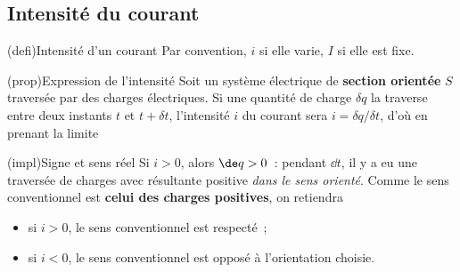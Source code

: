 \documentclass[../../main/main.tex]{subfiles}
\begin{document}
\subsection{Intensité du courant}

\begin{tcb}[label=def:intensité, sidebyside](defi){Intensité
			d'un courant}
	\tcblower
	Par convention, $i$ si elle varie, $I$ si elle est fixe.
\end{tcb}
\begin{tcb}[label=prop:intensité](prop){Expression de l'intensité}
	Soit un système électrique de \textbf{section orientée} $S$ traversée par
	des charges électriques. Si une quantité de charge $\delta q$ la traverse
	entre deux instants $t$ et $t + \delta t$, l'intensité $i$ du courant sera
	$i = \delta q/\delta t$, d'où en prenant la limite
	\psw{
		\[
			\boxed{
				i(t) =
				\lim_{\delta t \ra 0} \frac{\delta q}{\delta t} =
				\dv{q}{t}
			}
		\]
	}
	\vspace{-15pt}
\end{tcb}
\begin{tcb}[label=impl:intensconv](impl){Signe et sens réel}
	Si $i > 0$, alors $\de q > 0$~: pendant $\dd{t}$, il y a eu une traversée
	de charges avec résultante positive \textit{dans le sens orienté}. Comme le
	sens conventionnel est \textbf{celui des charges positives}, on retiendra
	\begin{itemize}
		\item si $i > 0$, le sens conventionnel est respecté~;
		\item si $i < 0$, le sens conventionnel est opposé à l'orientation
		      choisie.
	\end{itemize}
\end{tcb}
\end{document}
